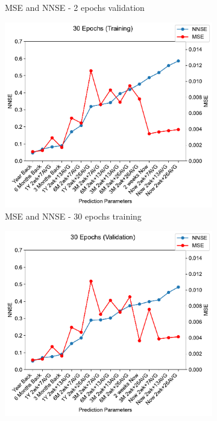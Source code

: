 \documentclass[11pt,twocolumn]{article}
\begin{document}
\begin{figure}[p]
\begin{subfigure}[b]{0.49\textwidth}
        \caption{MSE and NNSE - 2 epochs validation}
        \label{fig:tbd2}
     \end{subfigure}
     \hfill
     \newline
     \begin{subfigure}[b]{0.49\textwidth}
        \centering\includegraphics[width=1.0\linewidth]{images/30_training-MSE-and-NNSE.pdf}
        \caption{MSE and NNSE - 30 epochs training}
        \label{fig:tbd3}
     \end{subfigure}
     \hfill
     \begin{subfigure}[b]{0.49\textwidth}
        \centering\includegraphics[width=1.0\linewidth]{images/30_validation-MSE-and-NNSE.pdf}

\end{subfigure}
\end{figure}
\end{document}
